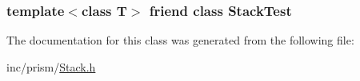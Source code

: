 \subsubsection[{\texorpdfstring{Stack\+Test}{StackTest}}]{\setlength{\rightskip}{0pt plus 5cm}template$<$class T$>$ friend class Stack\+Test\hspace{0.3cm}{\ttfamily [friend]}}\hypertarget{classprism_1_1_stack_a660ffbd70515df798aa6fe2edafb3156}{}\label{classprism_1_1_stack_a660ffbd70515df798aa6fe2edafb3156}


The documentation for this class was generated from the following file\+:\begin{DoxyCompactItemize}
\item 
inc/prism/\hyperlink{_stack_8h}{Stack.\+h}\end{DoxyCompactItemize}
